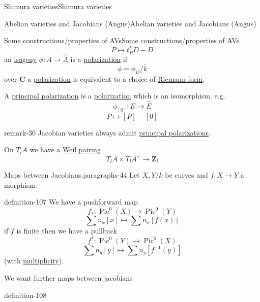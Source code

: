 \documentclass[10pt,]{book}
\numberwithin{equation}{section}
\newcommand{\inv}{^{-1}}
\newcommand{\ZZ}{\mathbf{Z}}
\newcommand{\CC}{\mathbf{C}}
\DeclareMathOperator{\Pic}{Pic}
\begin{document}
\begin{chapterptx}{Shimura varieties}{}{Shimura varieties}{}{}
\begin{sectionptx}{Abelian varieties and Jacobians (Angus)}{}{Abelian varieties and Jacobians (Angus)}{}{}
\begin{subsectionptx}{Some constructions/properties of AVs}{}{Some constructions/properties of AVs}{}{}
\begin{equation*}
P \mapsto t_P^* D -D
\end{equation*}
an \hyperref[def-supersing-isog-isog]{isogeny} \(\phi\colon A\to \hat A\) is a \hyperref[def-polarization]{polarization} if%
\begin{equation*}
\phi =  \phi_D /\bar k
\end{equation*}
over \(\CC\)  a \hyperref[def-polarization]{polarization} is equivalent to a choice of \hyperref[def-riemann-form]{Riemann form}.%
\par
\hypertarget{p-1112}{}%
A \hyperref[def-polarization]{principal polarization} is a \hyperref[def-polarization]{polarization} which is an isomorphism. e.g.%
\begin{equation*}
\phi_{[0]} \colon E \to \hat E
\end{equation*}
%
\begin{equation*}
P \mapsto [P] - [0]
\end{equation*}
%
\begin{remark}{}{remark-30}%
\hypertarget{p-1113}{}%
Jacobian varieties always admit \hyperref[def-polarization]{principal polarizations}.%
\end{remark}
\hypertarget{p-1114}{}%
On \(T_lA \) we have  a \hyperref[prop-weil-pair]{Weil pairing}%
\begin{equation*}
T_lA \times T_lA^\vee \to \ZZ_l
\end{equation*}
%
\begin{paragraphs}{Maps between Jacobians.}{paragraphs-44}%
\hypertarget{p-1115}{}%
Let \(X,Y/k\) be curves and \(f\colon X \to Y\) a morphism.%
\begin{definition}{}{definition-107}%
\hypertarget{p-1116}{}%
We have a pushforward map%
\begin{equation*}
f_*\colon \Pic^0(X) \to \Pic^0(Y)
\end{equation*}
%
\begin{equation*}
\sum n_x [x] \mapsto \sum n_x[f(x)]
\end{equation*}
if \(f\) is finite then we have  a pullback%
\begin{equation*}
f^* \colon \Pic^0(Y) \to \Pic^0(X)
\end{equation*}
%
\begin{equation*}
\sum n_y[y] \mapsto \sum n_y [f\inv (y)]
\end{equation*}
(with \hyperref[def-riem-order-vanish]{multiplicity}).%
\end{definition}
\hypertarget{p-1117}{}%
We want further maps between jacobians%
\begin{definition}{}{definition-108}%

\end{definition}
\end{paragraphs}
\end{subsectionptx}
\end{sectionptx}
\end{chapterptx}
\end{document}
